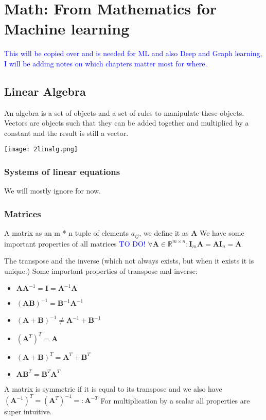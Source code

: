 \documentclass{article}
\newcommand{\tblue}[1]{\textcolor{blue}{#1}}
\begin{document}
\section{Math: From Mathematics for Machine learning}
\tblue{This will be copied over and is needed for ML and also Deep and Graph learning,
I will be adding notes on which chapters matter most for where.}

\subsection{Linear Algebra}
An algebra is a set of objects and a set of rules to manipulate these objects.
Vectors are objects such that they can be added together and multiplied by a constant and the result is still a vector.
\begin{center}
    \texttt{[image: 2linalg.png]} %
\end{center}
\subsubsection{Systems of linear equations}
We will mostly ignore for now.

\subsubsection{Matrices}
A matrix as an m * n tuple of elements $a_{ij}$, we define it as \textbf{A}
We have some important properties of all matrices \tblue{TO DO!}
$\forall \textbf{A} \in \mathbb{R}^{m \times n} : \textbf{I}_m \textbf{A} = \textbf{A} \textbf{I}_n = \textbf{A} $

The transpose and the inverse (which not always exists, but when it exists it is unique.)
Some important properties of transpose and inverse:
\begin{itemize}
    \item $\textbf{A} \textbf{A}^{-1} = \textbf{I} = \textbf{A}^{-1}\textbf{A}$
    \item $(\textbf{A}\textbf{B})^{-1} = \textbf{B}^{-1} \textbf{A}^{-1}$
    \item $(\textbf{A} + \textbf{B})^{-1} \neq \textbf{A}^{-1} + \textbf{B}^{-1}$
    \item $(\textbf{A}^T)^{T} = \textbf{A}$
    \item $(\textbf{A} + \textbf{B})^T = \textbf{A}^T + \textbf{B}^T$
    \item $\textbf{AB}^T = \textbf{B}^T \textbf{A}^T$
\end{itemize}
A matrix is symmetric if it is equal to its transpose and we also have $(\textbf{A}^{-1})^T = (\textbf{A}^T)^{-1} =: \textbf{A}^{-T}$
For multiplication by a scalar all properties are super intuitive.
\end{document}

